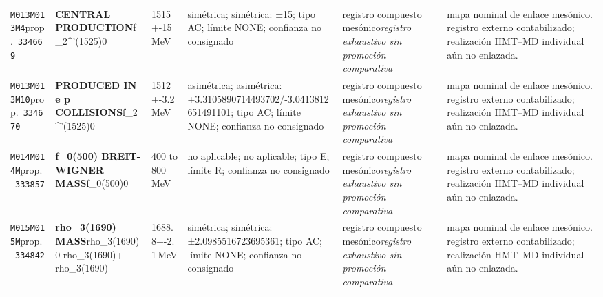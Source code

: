 \begin{landscape}
\begin{longtable}{L{1.85cm}L{4.45cm}L{2.35cm}L{4.05cm}L{3.35cm}L{7.15cm}}
\texttt{M013}\newline \texttt{M013M4}\newline prop.\ \texttt{334669} & \textbf{CENTRAL PRODUCTION}\newline f\_\allowbreak{}2\textasciicircum{}'(1525)0 & 1515+-15\,MeV & simétrica; simétrica: ±15; tipo AC; límite NONE; confianza no consignado & registro compuesto mesónico\newline \emph{registro exhaustivo sin promoción comparativa} & mapa nominal de enlace mesónico. registro externo contabilizado; realización HMT--MD individual aún no enlazada. \\
\texttt{M013}\newline \texttt{M013M10}\newline prop.\ \texttt{334670} & \textbf{PRODUCED IN e p COLLISIONS}\newline f\_\allowbreak{}2\textasciicircum{}'(1525)0 & 1512+-3.2\,MeV & asimétrica; asimétrica: +3.3105890714493702/-3.0413812651491101; tipo AC; límite NONE; confianza no consignado & registro compuesto mesónico\newline \emph{registro exhaustivo sin promoción comparativa} & mapa nominal de enlace mesónico. registro externo contabilizado; realización HMT--MD individual aún no enlazada. \\
\texttt{M014}\newline \texttt{M014M}\newline prop.\ \texttt{333857} & \textbf{f\_\allowbreak{}0(500) BREIT-WIGNER MASS}\newline f\_\allowbreak{}0(500)0 & 400 to 800\,MeV & no aplicable; no aplicable; tipo E; límite R; confianza no consignado & registro compuesto mesónico\newline \emph{registro exhaustivo sin promoción comparativa} & mapa nominal de enlace mesónico. registro externo contabilizado; realización HMT--MD individual aún no enlazada. \\
\texttt{M015}\newline \texttt{M015M}\newline prop.\ \texttt{334842} & \textbf{rho\_\allowbreak{}3(1690) MASS}\newline rho\_\allowbreak{}3(1690)0 \textbar{}\allowbreak{} rho\_\allowbreak{}3(1690)+ \textbar{}\allowbreak{} rho\_\allowbreak{}3(1690)- & 1688.8+-2.1\,MeV & simétrica; simétrica: ±2.0985516723695361; tipo AC; límite NONE; confianza no consignado & registro compuesto mesónico\newline \emph{registro exhaustivo sin promoción comparativa} & mapa nominal de enlace mesónico. registro externo contabilizado; realización HMT--MD individual aún no enlazada. \\

\end{longtable}
\end{landscape}
